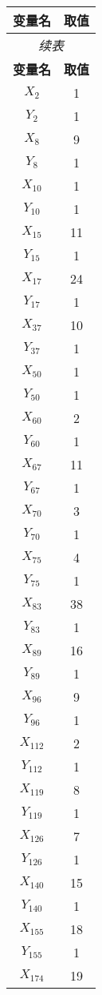 \documentclass[a4paper,10pt]{article}
\begin{document}
\begin{center}
\begin{longtable}{cc}
\toprule
\textbf{变量名} & \textbf{取值} \\
\midrule
\endfirsthead
\multicolumn{2}{c}{\textit{续表}} \\
\toprule
\textbf{变量名} & \textbf{取值} \\
\midrule
\endhead
\bottomrule
\endfoot
\bottomrule
\endlastfoot
$X_{2}$ & 1 \\
$Y_{2}$ & 1 \\
$X_{8}$ & 9 \\
$Y_{8}$ & 1 \\
$X_{10}$ & 1 \\
$Y_{10}$ & 1 \\
$X_{15}$ & 11 \\
$Y_{15}$ & 1 \\
$X_{17}$ & 24 \\
$Y_{17}$ & 1 \\
$X_{37}$ & 10 \\
$Y_{37}$ & 1 \\
$X_{50}$ & 1 \\
$Y_{50}$ & 1 \\
$X_{60}$ & 2 \\
$Y_{60}$ & 1 \\
$X_{67}$ & 11 \\
$Y_{67}$ & 1 \\
$X_{70}$ & 3 \\
$Y_{70}$ & 1 \\
$X_{75}$ & 4 \\
$Y_{75}$ & 1 \\
$X_{83}$ & 38 \\
$Y_{83}$ & 1 \\
$X_{89}$ & 16 \\
$Y_{89}$ & 1 \\
$X_{96}$ & 9 \\
$Y_{96}$ & 1 \\
$X_{112}$ & 2 \\
$Y_{112}$ & 1 \\
$X_{119}$ & 8 \\
$Y_{119}$ & 1 \\
$X_{126}$ & 7 \\
$Y_{126}$ & 1 \\
$X_{140}$ & 15 \\
$Y_{140}$ & 1 \\
$X_{155}$ & 18 \\
$Y_{155}$ & 1 \\
$X_{174}$ & 19 \\

\end{longtable}
\end{center}
\end{document}

